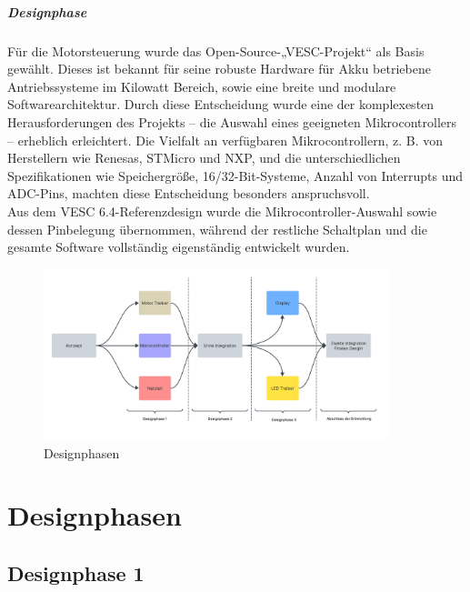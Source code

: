 \documentclass[paper=a4,11pt]{scrreprt}
\begin{document}
\paragraph{Designphase}
Für die Motorsteuerung wurde das Open-Source-„VESC-Projekt“ als Basis gewählt. Dieses ist bekannt für seine robuste Hardware für Akku betriebene Antriebssysteme im Kilowatt Bereich, sowie eine breite und modulare Softwarearchitektur. Durch diese Entscheidung wurde eine der komplexesten Herausforderungen des Projekts – die Auswahl eines geeigneten Mikrocontrollers – erheblich erleichtert. Die Vielfalt an verfügbaren Mikrocontrollern, z. B. von Herstellern wie Renesas, STMicro und NXP, und die unterschiedlichen Spezifikationen wie Speichergröße, 16/32-Bit-Systeme, Anzahl von Interrupts und ADC-Pins, machten diese Entscheidung besonders anspruchsvoll.\\
Aus dem VESC 6.4-Referenzdesign wurde die Mikrocontroller-Auswahl sowie dessen Pinbelegung übernommen, während der restliche Schaltplan und die gesamte Software vollständig eigenständig entwickelt wurden.
\newpage
\begin{figure}[ht]
\begin{center}
\includegraphics[angle=90,width=10cm]{Bilder/DesignPhase.PNG}
\caption{Designphasen}
\label{designp}
\end{center}
\end{figure}
\newpage
\chapter{Designphasen}
\section{Designphase 1}
\end{document}
